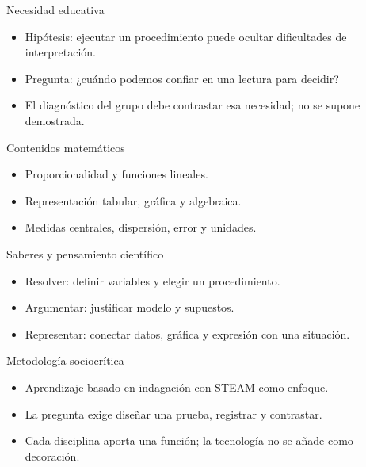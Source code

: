 \documentclass[
	spanish,
	aspectratio=1610,
	xcolor={dvipsnames,table}
]{beamer}
\begin{document}
\begin{frame}{Necesidad educativa}
\fontsize{14}{18}\selectfont\begin{itemize}\setlength{\itemsep}{.45cm}
\item Hipótesis: ejecutar un procedimiento puede ocultar dificultades de interpretación.
\item Pregunta: ¿cuándo podemos confiar en una lectura para decidir?
\item El diagnóstico del grupo debe contrastar esa necesidad; no se supone demostrada.
\end{itemize}
\end{frame}
\begin{frame}{Contenidos matemáticos}
\fontsize{14}{18}\selectfont\begin{itemize}\setlength{\itemsep}{.45cm}
\item Proporcionalidad y funciones lineales.
\item Representación tabular, gráfica y algebraica.
\item Medidas centrales, dispersión, error y unidades.
\end{itemize}
\end{frame}
\begin{frame}{Saberes y pensamiento científico}
\fontsize{14}{18}\selectfont\begin{itemize}\setlength{\itemsep}{.45cm}
\item Resolver: definir variables y elegir un procedimiento.
\item Argumentar: justificar modelo y supuestos.
\item Representar: conectar datos, gráfica y expresión con una situación.
\end{itemize}
\end{frame}
\begin{frame}{Metodología sociocrítica}
\fontsize{14}{18}\selectfont\begin{itemize}\setlength{\itemsep}{.45cm}
\item Aprendizaje basado en indagación con STEAM como enfoque.
\item La pregunta exige diseñar una prueba, registrar y contrastar.
\item Cada disciplina aporta una función; la tecnología no se añade como decoración.
\end{itemize}
\end{frame}
\end{document}
